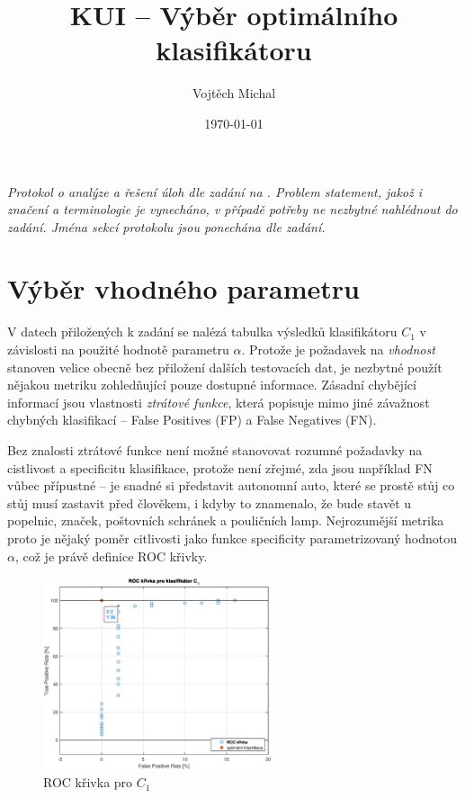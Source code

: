 \documentclass[twoside]{article}
\title{KUI -- Výběr optimálního klasifikátoru}
\author{Vojtěch Michal}
\date{\today}
\begin{document}
\maketitle

\textit{Protokol o analýze a řešení úloh dle zadání na \cite{zadani}. Problem statement, jakož i značení a terminologie je vynecháno,
v případě potřeby ne nezbytné nahlédnout do zadání. Jména sekcí protokolu jsou ponechána dle zadání.}


\section{Výběr vhodného parametru}
V datech přiložených k zadání se nalézá tabulka výsledků klasifikátoru $C_1$ v závislosti na použité hodnotě parametru $\alpha$.
Protože je požadavek na \textit{vhodnost} stanoven velice obecně bez přiložení dalších testovacích dat, je nezbytné použít nějakou
metriku zohledňující pouze dostupné informace. Zásadní chybějící informací jsou vlastnosti \textit {ztrátové funkce}, která popisuje
mimo jiné závažnost chybných klasifikací -- False Positives (FP) a False Negatives (FN).

Bez znalosti ztrátové funkce není možné stanovovat rozumné požadavky na cistlivost a specificitu klasifikace, protože není zřejmé,
zda jsou například FN vůbec přípustné -- je snadné si představit autonomní auto, které se prostě stůj co stůj musí zastavit před člověkem,
i kdyby to znamenalo, že bude stavět u popelnic, značek, poštovních schránek a pouličních lamp. Nejrozumější metrika proto je nějaký poměr 
citlivosti jako funkce specificity parametrizovaný hodnotou $\alpha$, což je právě definice ROC křivky.

\begin{figure}[h]
	\centering
	\includegraphics[width=0.6\textwidth]{roc.eps}
	\caption{ROC křivka pro $C_1$}
	\label{fig:roc}
\end{figure}
\end{document}
